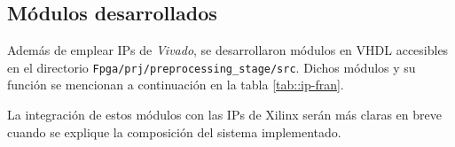 \documentclass[../../main.tex]{subfiles}
\begin{document}
\subsection{Módulos desarrollados}
Además de emplear IPs de \textit{Vivado}, se desarrollaron módulos en VHDL accesibles en el directorio \texttt{Fpga/prj/preprocessing\_stage/src}. Dichos módulos y su función se mencionan a continuación en la tabla \ref{tab::ip-fran}.

La integración de estos módulos con las IPs de Xilinx serán más claras en breve cuando se explique la composición del sistema implementado.

\begin{table}[H]
\centering
\end{table}
\end{document}
